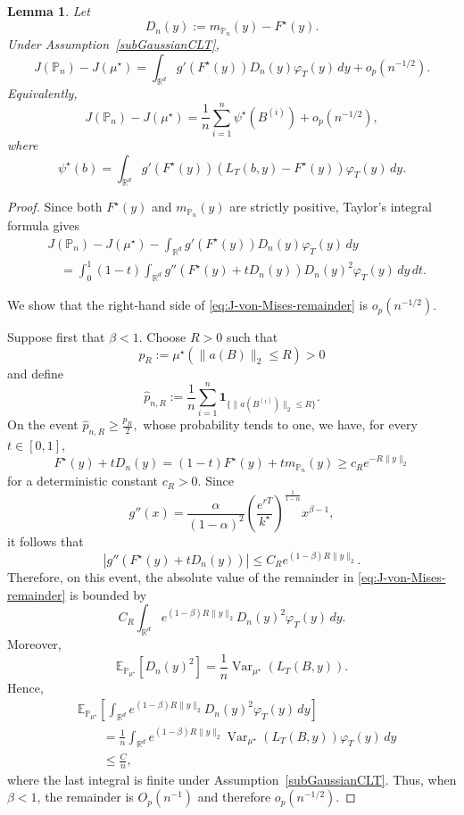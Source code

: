 \documentclass[11pt]{article}
\newtheorem{lemma}{Lemma}
\theoremstyle{definition}
\newcommand{\E}{\mathbb{E}}
\begin{document}
\begin{lemma}\label{Frechet}
Let
\[
D_n(y)
:=
m_{\mathbb P_n}(y)-F^\star(y).
\]
Under Assumption~\ref{subGaussianCLT},
\[
J(\mathbb P_n)-J(\mu^\star)
=
\int_{\mathbb R^d}
g'\!\left(F^\star(y)\right)
D_n(y)
\varphi_T(y)\,dy
+
o_p(n^{-1/2}).
\]
Equivalently,
\[
J(\mathbb P_n)-J(\mu^\star)
=
\frac1n
\sum_{i=1}^n
\psi^\star(B^{(i)})
+
o_p(n^{-1/2}),
\]
where
\[
\psi^\star(b)
=
\int_{\mathbb R^d}
g'\!\left(F^\star(y)\right)
\left(
L_T(b,y)-F^\star(y)
\right)
\varphi_T(y)\,dy.
\]
\end{lemma}

\begin{proof}
Since both $F^\star(y)$ and $m_{\mathbb P_n}(y)$ are strictly
positive, Taylor's integral formula gives
\begin{align}
&
J(\mathbb P_n)-J(\mu^\star)
-
\int_{\mathbb R^d}
g'\!\left(F^\star(y)\right)
D_n(y)
\varphi_T(y)\,dy
\nonumber\\
&\quad=
\int_0^1(1-t)
\int_{\mathbb R^d}
g''\!\left(
F^\star(y)+tD_n(y)
\right)
D_n(y)^2
\varphi_T(y)\,dy\,dt.
\label{eq:J-von-Mises-remainder}
\end{align}

We show that the right-hand side of
\eqref{eq:J-von-Mises-remainder} is $o_p(n^{-1/2})$.

Suppose first that $\beta<1$. Choose $R>0$ such that
\[
p_R
:=
\mu^\star\!\left(
\|a(B)\|_2\leq R
\right)
>0
\]
and define
\[
\widehat p_{n,R}
:=
\frac1n
\sum_{i=1}^n
\mathbf 1_{\{\|a(B^{(i)})\|_2\leq R\}}.
\]
On the event $\widehat p_{n,R}\geq\frac{p_R}{2},$
whose probability tends to one, we have, for every
$t\in[0,1]$,
\[
F^\star(y)+tD_n(y)
=
(1-t)F^\star(y)+tm_{\mathbb P_n}(y)
\geq
c_R e^{-R\|y\|_2}
\]
for a deterministic constant $c_R>0$. Since
\[
g''(x)
=
\frac{\alpha}{(1-\alpha)^2}
\left(
\frac{e^{rT}}{k^\star}
\right)^{\frac{1}{1-\alpha}}
x^{\beta-1},
\]
it follows that
\[
\left|
g''\!\left(
F^\star(y)+tD_n(y)
\right)
\right|
\leq
C_R
e^{(1-\beta)R\|y\|_2}.
\]
Therefore, on this event, the absolute value of the remainder in
\eqref{eq:J-von-Mises-remainder} is bounded by
\[
C_R
\int_{\mathbb R^d}
e^{(1-\beta)R\|y\|_2}
D_n(y)^2
\varphi_T(y)\,dy.
\]
Moreover,
\[
\E_{\mathbb P_{\mu^\star}}
\left[
D_n(y)^2
\right]
=
\frac1n
\operatorname{Var}_{\mu^\star}
\left(
L_T(B,y)
\right).
\]
Hence,
\begin{align*}
&
\E_{\mathbb P_{\mu^\star}}
\left[
\int_{\mathbb R^d}
e^{(1-\beta)R\|y\|_2}
D_n(y)^2
\varphi_T(y)\,dy
\right]
\\
&\qquad=
\frac1n
\int_{\mathbb R^d}
e^{(1-\beta)R\|y\|_2}
\operatorname{Var}_{\mu^\star}
\left(
L_T(B,y)
\right)
\varphi_T(y)\,dy
\\
&\qquad\leq
\frac{C}{n},
\end{align*}
where the last integral is finite under
Assumption~\ref{subGaussianCLT}. Thus, when $\beta<1$, the
remainder is $O_p(n^{-1})$ and therefore
$o_p(n^{-1/2})$.


\end{proof}
\end{document}
